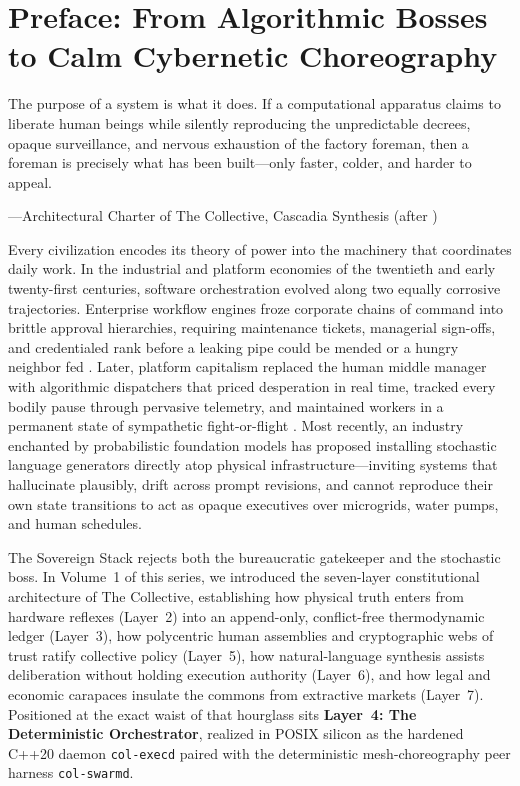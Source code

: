 \chapter*{Preface: From Algorithmic Bosses to Calm Cybernetic Choreography}

\epigraph{The purpose of a system is what it does. If a computational apparatus claims to liberate human beings while silently reproducing the unpredictable decrees, opaque surveillance, and nervous exhaustion of the factory foreman, then a foreman is precisely what has been built---only faster, colder, and harder to appeal.}{---Architectural Charter of The Collective, Cascadia Synthesis (after \textcite{beer1974})}

Every civilization encodes its theory of power into the machinery that coordinates daily
work. In the industrial and platform economies of the twentieth and early twenty-first
centuries, software orchestration evolved along two equally corrosive trajectories.
Enterprise workflow engines froze corporate chains of command into brittle approval
hierarchies, requiring maintenance tickets, managerial sign-offs, and credentialed rank
before a leaking pipe could be mended or a hungry neighbor fed \parencite{scott1998}. Later,
platform capitalism replaced the human middle manager with algorithmic dispatchers that
priced desperation in real time, tracked every bodily pause through pervasive telemetry, and
maintained workers in a permanent state of sympathetic fight-or-flight
\parencite{zuboff2019,han2015}. Most recently, an industry enchanted by probabilistic
foundation models has proposed installing stochastic language generators directly atop
physical infrastructure---inviting systems that hallucinate plausibly, drift across prompt
revisions, and cannot reproduce their own state transitions to act as opaque executives over
microgrids, water pumps, and human schedules.

The Sovereign Stack rejects both the bureaucratic gatekeeper and the stochastic boss. In
Volume~1 of this series, we introduced the seven-layer constitutional architecture of The
Collective, establishing how physical truth enters from hardware reflexes (Layer~2) into an
append-only, conflict-free thermodynamic ledger (Layer~3), how polycentric human assemblies
and cryptographic webs of trust ratify collective policy (Layer~5), how natural-language
synthesis assists deliberation without holding execution authority (Layer~6), and how legal
and economic carapaces insulate the commons from extractive markets (Layer~7). Positioned at
the exact waist of that hourglass sits \textbf{Layer~4: The Deterministic Orchestrator},
realized in POSIX silicon as the hardened C++20 daemon \texttt{col-execd} paired with the
deterministic mesh-choreography peer harness \texttt{col-swarmd}.

